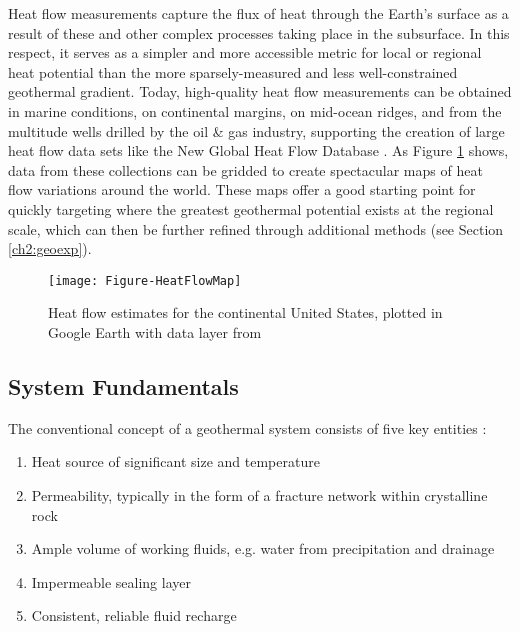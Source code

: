 Heat flow measurements capture the flux of heat through the Earth’s surface as a result of these and other complex processes taking place in the subsurface. In this respect, it serves as a simpler and more accessible metric for local or regional heat potential than the more sparsely-measured and less well-constrained geothermal gradient. Today, high-quality heat flow measurements can be obtained in marine conditions, on continental margins, on mid-ocean ridges, and from the multitude wells drilled by the oil \& gas industry, supporting the creation of large heat flow data sets like the New Global Heat Flow Database \citep{lucazeau_analysis_2019}. As Figure \ref{fig:heatflow} shows, data from these collections can be gridded to create spectacular maps of heat flow variations around the world. These maps offer a good starting point for quickly targeting where the greatest geothermal potential exists at the regional scale, which can then be further refined through additional methods (see Section \ref{ch2:geoexp}).
\begin{figure}[h!]
\centering
\texttt{[image: Figure-HeatFlowMap]}
\caption[Heat flow across the continental U.S.]{Heat flow estimates for the continental United States, plotted in Google Earth with data layer from \protect\citep{lucazeau_analysis_2019}}
\label{fig:heatflow}
\end{figure}

\subsection{System Fundamentals}\label{ch2:sysfund}
The conventional concept of a geothermal system consists of five key entities \citep[~p. 9]{dipippo_geothermal_2012}:
\renewcommand{\labelenumi}{\roman{enumi}}
\begin{enumerate}\label{list:sysreq}
   \item Heat source of significant size and temperature
   \item Permeability, typically in the form of a fracture network within crystalline rock
   \item Ample volume of working fluids, e.g. water from precipitation and drainage
   \item Impermeable sealing layer
   \item Consistent, reliable fluid recharge
\end{enumerate}

